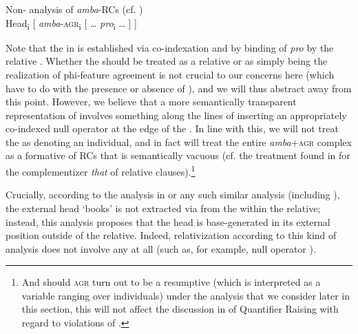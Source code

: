 \documentclass[output=paper,modfonts,nonflat,hidelinks]{langsci/langscibook}
\begin{document}
  
\ea\label{ex:gould:2}
Non- analysis of \textit{amba}{}-RCs (cf. \citealt{Keach2004})\\
Head\textsubscript{i} [ \textit{amba}{}-\textsc{agr}\textsubscript{i} [ … \textit{pro}\textsubscript{i} … ] ]
\z

  
Note that the  in  is established via co-indexa\-tion and by binding of \textit{pro} by the relative . Whether the  should be treated as a relative  or as simply being the realization of phi-feature agreement is not crucial to our concerns here (which have to do with the presence or absence of ), and we will thus abstract away from this point. However, we believe that a more semantically transparent representation of  involves something along the lines of inserting an appropriately co-indexed null operator at the edge of the . In line with this, we will not treat the  as denoting an individual, and in fact will treat the entire \textit{amba}+\textsc{agr} complex as a formative of RCs that is semantically vacuous (cf. the treatment found in \citet{Heim1998} for the complementizer \textit{that} of  relative clauses).\footnote{And should \textsc{agr} turn out to be a resumptive  (which is interpreted as a variable ranging over individuals) under the  analysis that we consider later in this section, this will not affect the discussion in  of Quantifier Raising with regard to violations of .}

Crucially, according to the analysis in  or any such similar analysis (including \citealt{Barrett-Keach1985}), the external head ‘books’ is not extracted via  from the  within the relative; instead, this analysis proposes that the head is base-generated in its external position outside of the relative. Indeed, relativization according to this kind of analysis does not involve any  at all (such as, for example, null operator ).
\end{document}
